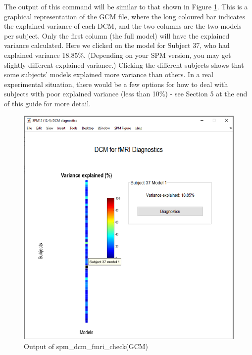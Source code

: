 \documentclass{article}
\begin{document}
The output of this command will be similar to that shown in Figure \ref{Fig_spm_dcm_fmri_check_part1}. This is a graphical representation of the GCM file, where the long coloured bar indicates the explained variance of each DCM, and the two columns are the two models per subject. Only the first column (the full model) will have the explained variance calculated. Here we clicked on the model for Subject 37, who had explained variance 18.85\%. (Depending on your SPM version, you may get slightly different explained variance.) Clicking the different subjects shows that some subjects' models explained more variance than others. In a real experimental situation, there would be a few options for how to deal with subjects with poor explained variance (less than 10\%) - see Section 5 at the end of this guide for more detail.

\begin{figure}[h]
\begin{center}
\includegraphics{"Fig_spm_dcm_fmri_check_part1"}
\caption{Output of spm\_dcm\_fmri\_check(GCM) \label{Fig_spm_dcm_fmri_check_part1}}
\end{center}
\end{figure}
\end{document}
